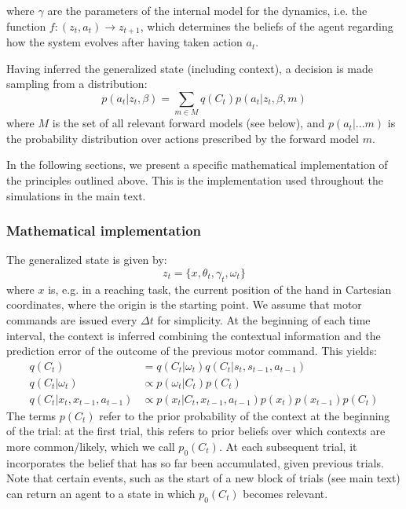 \documentclass[a4paper,doc,floatsintext,natbib]{apa6}
\begin{document}
where $\gamma$ are the parameters of the internal model for the dynamics,
i.e. the function $f: (z_t, a_t) \rightarrow z_{t+1}$, which determines the beliefs of
the agent regarding how the system evolves after having taken action $a_t$.

Having inferred the generalized state (including context), a decision is made
sampling from a distribution:
\begin{equation}
p(a_t | z_t, \beta) = \displaystyle\sum_{m \in M}q(C_t)p(a_t | z_t, \beta, m)
\end{equation}
where $M$ is the set of all relevant forward models (see below), and
$p(a_t | ... m)$ is the probability distribution over actions prescribed by the
forward model $m$.

In the following sections, we present a specific mathematical implementation
of the principles outlined above. This is the implementation used throughout the
simulations in the main text.

\subsubsection{Mathematical implementation}
The generalized state is given by:
\begin{equation}
z_t = \{x, \theta_t, \gamma_t, \omega_t\}
\end{equation}
where $x$ is, e.g. in a reaching task, the current position of the hand in
Cartesian coordinates, where the origin is the starting point. We assume that
motor commands are issued every $\Delta t$ for simplicity. At the beginning of
each time interval, the context is inferred combining the contextual
information and the prediction error of the outcome of the previous motor
command. This yields:
\begin{align}
  q(C_t) &= q(C_t | \omega_t)q(C_t | s_t, s_{t-1}, a_{t-1}) \\ \label{eqn:estimated-context}
  q(C_t | \omega_t) &\propto p(\omega_t | C_t)p(C_t) \\
  q(C_t | x_t, x_{t-1}, a_{t-1}) &\propto p(x_t | C_t, x_{t-1}, a_{t-1})p(x_t)p(x_{t-1})p(C_t)
\end{align}
The terms $p(C_t)$ refer to the prior probability of the context at the
beginning of the trial: at the first trial, this refers to prior beliefs over
which contexts are more common/likely, which we call $p_0(C_t)$. At each
subsequent trial, it incorporates the belief that has so far been accumulated,
given previous trials. Note that certain events, such as the start of a new
block of trials (see main text) can return an agent to a state in which
$p_0(C_t)$ becomes relevant.
\end{document}
